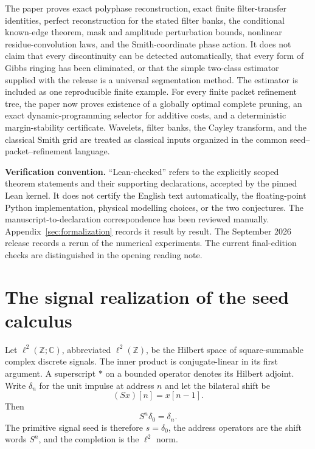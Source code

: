 \documentclass[11pt,letterpaper]{article}
\theoremstyle{plain}
\theoremstyle{plain}
\theoremstyle{plain}
\theoremstyle{definition}
\theoremstyle{definition}
\theoremstyle{definition}
\theoremstyle{definition}
\theoremstyle{remark}
\theoremstyle{remark}
\theoremstyle{remark}
\theoremstyle{remark}
\newcommand{\bbC}{\mathbb C}
\newcommand{\bbZ}{\mathbb Z}
\begin{document}
\begin{interpretation}[title={Scope and claim boundary}]
 The paper proves exact polyphase reconstruction, exact finite filter-transfer identities, perfect reconstruction for the stated filter banks, the conditional known-edge theorem, mask and amplitude perturbation bounds, nonlinear residue-convolution laws, and the Smith-coordinate phase action. It does not claim that every discontinuity can be detected automatically, that every form of Gibbs ringing has been eliminated, or that the simple two-class estimator supplied with the release is a universal segmentation method. The estimator is included as one reproducible finite example.  For every finite packet refinement tree, the paper now proves existence of a globally optimal complete pruning, an exact dynamic-programming selector for additive costs, and a deterministic margin-stability certificate. Wavelets, filter banks, the Cayley transform, and the classical Smith grid are treated as classical inputs organized in the common seed--packet--refinement language.
\end{interpretation}

\clearpage
\noindent\textbf{Verification convention.} ``Lean-checked'' refers to the explicitly scoped theorem statements and their supporting declarations, accepted by the pinned Lean kernel. It does not certify the English text automatically, the floating-point Python implementation, physical modelling choices, or the two conjectures. The manuscript-to-declaration correspondence has been reviewed manually. Appendix~\ref{sec:formalization} records it result by result. The September 2026 release records a rerun of the numerical experiments. The current final-edition checks are distinguished in the opening reading note.



\section{The signal realization of the seed calculus}\label{core:section:01}

Let $\ell^2(\bbZ;\bbC)$, abbreviated $\ell^2(\bbZ)$, be the Hilbert space of square-summable complex discrete signals. The inner product is conjugate-linear in its first argument. A superscript $*$ on a bounded operator denotes its Hilbert adjoint. Write $\delta_n$ for the unit impulse at address $n$ and let the bilateral shift be
\[
(Sx)[n]=x[n-1].
\]
Then
\[
S^n\delta_0=\delta_n.
\]
The primitive signal seed is therefore $s=\delta_0$, the address operators are the shift words $S^n$, and the completion is the $\ell^2$ norm.
\end{document}
